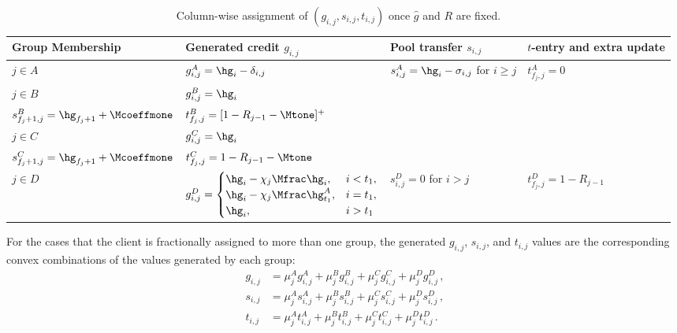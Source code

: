 \begin{table}[H]
\centering
\small
\caption{Column-wise assignment of $(g_{i,j},s_{i,j},t_{i,j})$ once $\hat g$ and $R$ are fixed.}
\label{tab:general-case-procedure}
\renewcommand{\arraystretch}{1.25}
\begin{tabularx}{\textwidth}{@{}>{\RaggedRight\arraybackslash}p{}>{\RaggedRight\arraybackslash}p{}>{\RaggedRight\arraybackslash}p{}>{\RaggedRight\arraybackslash}X@{}}
\toprule
Group Membership & Generated credit $g_{i,j}$ & Pool transfer $s_{i,j}$ & $t$-entry and extra update \\
\midrule
$j\in A$ &
$g_{i,j}^A = \hg_i-\delta_{i,j}$ &
$s_{i,j}^A = \hg_i-\sigma_{i,j}$ for $i\ge j$ &
$t_{f_j,j}^A = 0$ \\
\addlinespace[0.4em]
$j\in B$ &
$g_{i,j}^B = \hg_i$ &
\begin{tabular}{@{}l@{}}
    $s_{i,j}^B = \hg_i$ for $i>j$ \\
    $s_{f_j+1,j}^B=\hg_{f_j+1} + \Mcoeffmone$
\end{tabular}
& $t_{f_{j},j}^B= [1-R_{j-1} - \Mtone]^+$
\\
\addlinespace[0.4em]
$j\in C$ &
$g_{i,j}^C = \hg_i$ &
\begin{tabular}{@{}l@{}}
    $s_{i,j}^C = \hg_i$ for $i>j$ \\
    $s_{f_j+1,j}^C=\hg_{f_j+1} + \Mcoeffmone$
\end{tabular}
&$t_{f_{j},j}^C=1-R_{j-1} - \Mtone$
\\
\addlinespace[0.4em]
$j\in D$ &
$g_{i,j}^D = \begin{cases}
    \hg_i - \chi_j\Mfrac\hg_i, & i<t_1,\\
    \hg_i - \chi_j\Mfrac\hg_{t_1}^A, & i=t_1,\\
    \hg_i, & i>t_1
\end{cases}$ &
$s_{i,j}^D = 0$ for $i>j$ &
$t_{f_{j},j}^D=1-R_{j-1}$
\\
\bottomrule
\end{tabularx}
\end{table}

For the cases that the client is fractionally assigned to more than one group, the generated $g_{i,j}$, $s_{i,j}$, and $t_{i,j}$ values are the corresponding convex combinations of the values generated by each group:
\begin{equation}\label{formula:fractional-assignments-convex-combination}
    \begin{aligned}
        g_{i,j} &= \mu_j^A g_{i,j}^A + \mu_j^B g_{i,j}^B + \mu_j^C g_{i,j}^C + \mu_j^D g_{i,j}^D\,,\\
        s_{i,j} &= \mu_j^A s_{i,j}^A + \mu_j^B s_{i,j}^B + \mu_j^C s_{i,j}^C + \mu_j^D s_{i,j}^D\,,\\
        t_{i,j} &= \mu_j^A t_{i,j}^A + \mu_j^B t_{i,j}^B + \mu_j^C t_{i,j}^C + \mu_j^D t_{i,j}^D\,.
    \end{aligned}
\end{equation}

